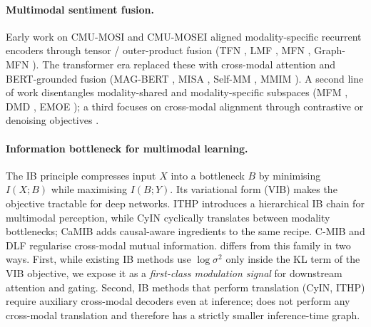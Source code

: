 \paragraph{Multimodal sentiment fusion.}
Early work on \textsc{CMU-MOSI} and \textsc{CMU-MOSEI} aligned
modality-specific recurrent encoders through tensor / outer-product
fusion (TFN \citep{zadeh2017tfn}, LMF \citep{liu2018lmf}, MFN
\citep{zadeh2018mfn}, Graph-MFN \citep{zadeh2018gmfn}).
The transformer era replaced these with cross-modal attention
\citep{tsai2019mult} and BERT-grounded fusion (MAG-BERT
\citep{rahman2020magbert}, MISA \citep{hazarika2020misa}, Self-MM
\citep{yu2021selfmm}, MMIM \citep{han2021mmim}).
A second line of work disentangles modality-shared and
modality-specific subspaces (MFM \citep{tsai2019mfm}, DMD
\citep{li2023dmd}, EMOE \citep{emoe2024}); a third focuses on
cross-modal alignment through contrastive or denoising objectives
\citep{wu2023dbf,boost2024}.

\paragraph{Information bottleneck for multimodal learning.}
The IB principle \citep{tishby2000information,tishby2015dnn} compresses
input $X$ into a bottleneck $B$ by minimising $I(X;B)$ while maximising
$I(B;Y)$.
Its variational form (VIB) \citep{alemi2017vib,kingma2014vae} makes the
objective tractable for deep networks.
ITHP \citep{ithp2024} introduces a hierarchical IB chain for
multimodal perception, while CyIN cyclically translates between
modality bottlenecks; CaMIB \citep{camib2026} adds causal-aware
ingredients to the same recipe.
C-MIB \citep{cmib2023} and DLF \citep{dlf2024} regularise cross-modal
mutual information.
\methodname{} differs from this family in two ways.
First, while existing IB methods use $\log\sigma^{2}$ only inside the
KL term of the VIB objective, we expose it as a \emph{first-class
modulation signal} for downstream attention and gating.
Second, IB methods that perform translation
(CyIN, ITHP) require auxiliary cross-modal decoders even at inference;
\methodname{} does not perform any cross-modal translation and
therefore has a strictly smaller inference-time graph.

